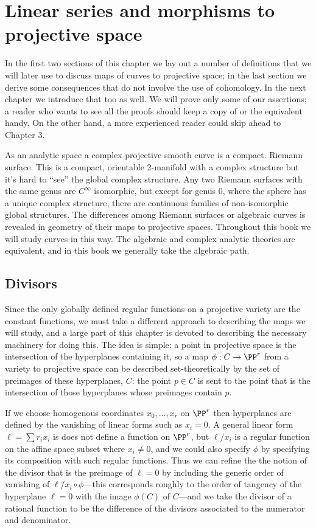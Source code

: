

\chapter{Linear series and morphisms to projective space}\label{linear series}

In the first two sections of this chapter we lay out a number of definitions that we will later use to discuss
maps of curves to projective space; in the last section we derive some consequences that do not involve the
use of cohomology. In the next chapter we introduce that too as well. We will prove only some of our assertions; a reader who wants to see all the proofs should keep a copy of \cite{Hartshorne1977} or the equivalent handy. On the other hand, a more experienced reader
could skip ahead to Chapter 3.

As an analytic space a complex projective smooth curve is a compact. Riemann surface. This is a compact, orientable 2-manifold with a complex structure but it's hard to ``see'' the global complex structure. Any two Riemann surfaces with the same genus are $C^\infty$ isomorphic, but except for genus 0, where the sphere has a unique complex structure,
there are continuous families of non-isomorphic global structures.  The differences among Riemann surfaces or algebraic curves is revealed in  geometry of their maps to projective spaces. Throughout this book we will study curves in this way. The algebraic and
complex analytic theories are equivalent, and in this book we generally take the algebraic path.

\section{Divisors}

Since the only  globally defined regular functions on a projective variety are the constant functions, we must take a different approach to describing the maps we will study, and a large part of this chapter is devoted to describing the necessary machinery for doing this. The idea is simple: a point in projective space is the intersection of the hyperplanes containing it, so a map $\phi: C\to \PP^r$ from a variety to projective space can be described set-theoretically
by the set of preimages of these hyperplanes, $C$: the point $p\in C$ is sent to the point
that is the intersection of those hyperplanes whose preimages contain $p$. 

If we choose homogenous coordinates $x_0,\dots, x_r$ on $\PP^r$ then hyperplanes
are defined by the vanishing of linear forms such as $x_i=0$. A general linear form
$\ell = \sum r_ix_i$ is does not define a function on $\PP^r$, but $\ell/x_i$ is a regular function on the affine space subset where $x_i\neq 0$, and we could also
 specify $\phi$ by specifying its composition with such regular functions. Thus we can refine the the notion of the divisor that is the preimage of $\ell=0$ by including the generic order of vanishing of $\ell/x_i \circ \phi$---this corresponds roughly to the order of tangency
 of the hyperplane $\ell=0$ with the image $\phi(C)$ of $C$---and we take the divisor of a rational
 function to be the difference of the divisors associated to the numerator and denominator.

